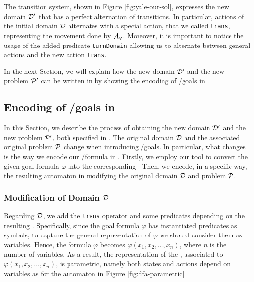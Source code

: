 The transition system, shown in Figure \ref{fig:yale-our-sol}, expresses the new domain $\D'$ that has a perfect alternation of transitions. In particular, actions of the initial domain $\D$ alternates with a special action, that we called \texttt{trans}, representing the movement done by $\automaton_\varphi$. Moreover, it is important to notice the usage of the added predicate \texttt{turnDomain} allowing us to alternate between general actions and the new action \texttt{trans}.

In the next Section, we will explain how the new domain $\D'$ and the new problem $\P'$ can be written in \PDDL by showing the encoding of \LTLf/\PLTL goals in \PDDL.

\subsection{Encoding of \LTLf/\PLTL goals in \PDDL}
In this Section, we describe the process of obtaining the new domain $\D'$ and the new problem $\P'$, both specified in \PDDL. The original \PDDL domain $\D$ and the associated original problem $\P$ change when introducing \LTLf/\PLTL goals. In particular, what changes is the way we encode our \LTLf/\PLTL formula in \PDDL. Firstly, we employ our \LTLfToDFA tool to convert the given goal formula $\varphi$ into the corresponding \DFA. Then, we encode, in a specific way, the resulting \DFA automaton in \PDDL modifying the original domain $\D$ and problem $\P$.

\subsubsection*{Modification of Domain $\D$}
Regarding $\D$, we add the \texttt{trans} operator and some predicates depending on the resulting \DFA. Specifically, since the goal formula $\varphi$ has instantiated predicates as symbols, to capture the general representation of $\varphi$ we should consider them as variables. Hence, the formula $\varphi$ becomes $\varphi(x_1,x_2,\dots,x_n)$, where $n$ is the number of variables. As a result, the representation of the \DFA, associated to $\varphi(x_1,x_2,\dots,x_n)$, is parametric, namely both states and actions depend on variables as for the automaton in Figure \ref{fig:dfa-parametric}.

